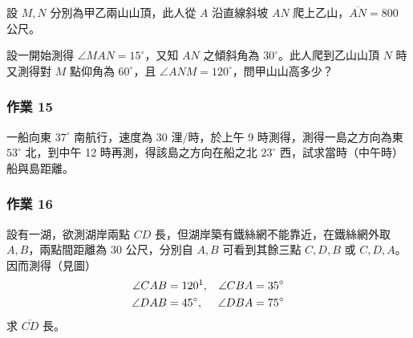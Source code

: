 設 $M, N$ 分別為甲乙兩山山頂，此人從 $A$ 沿直線斜坡 $AN$ 爬上乙山，$\overline{AN} = 800$ 公尺。

設一開始測得 $\angle MAN = 15^\circ$，又知 $AN$ 之傾斜角為 $30^\circ$。此人爬到乙山山頂 $N$ 時又測得對 $M$ 點仰角為 $60^\circ$，且 $\angle ANM = 120^\circ$，問甲山山高多少？

\subsubsection*{作業 15}
一船向東 $37^\circ$ 南航行，速度為 30 浬/時，於上午 9 時測得，測得一島之方向為東 $53^\circ$ 北，到中午 12 時再測，得該島之方向在船之北 $23^\circ$ 西，試求當時（中午時）船與島距離。

\label{note:b3-ch2-p66-homework16-deg}%
\subsubsection*{作業 16}
設有一湖，欲測湖岸兩點 $CD$ 長，但湖岸築有鐵絲網不能靠近，在鐵絲網外取 $A, B$，兩點間距離為 30 公尺，分別自 $A, B$ 可看到其餘三點 $C, D, B$ 或 $C, D, A$。因而測得（見圖）
\begin{align*}
\angle CAB &= 120\footnotemark, & \angle CBA &= 35^\circ \\
\angle DAB &= 45^\circ, & \angle DBA &= 75^\circ
\end{align*}
求 $\overline{CD}$ 長。

